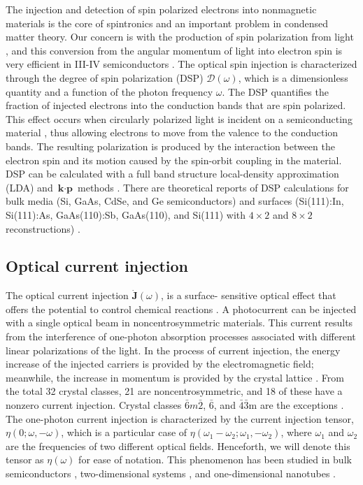 \documentclass[pss]{wiley2sp} %
\begin{document}
The injection and detection of spin polarized electrons into nonmagnetic
materials is the core of spintronics \cite{vzuticRMP04,fertRMP08} and an
important  problem in condensed matter theory. Our concern is with the
production of spin polarization from light \cite{LampelPRL68}, and this
conversion from the angular momentum of light into electron spin is very
efficient in III-IV semiconductors \cite{dyakonovOO84}. The optical spin
injection is characterized through the degree of spin polarization (DSP)
$\mathcal{D}(\omega)$, which is a dimensionless quantity and a function of the
photon frequency $\omega$. The DSP quantifies the fraction of injected
electrons into the conduction bands that are spin polarized. This effect
occurs when circularly polarized light is incident on a semiconducting
material \cite{dyakonovOO84}, thus allowing electrons to move from the valence
to the conduction bands. The resulting polarization is produced by the
interaction between the electron spin and its motion caused by the spin-orbit
coupling in the material. DSP can be calculated with a full band structure
local-density approximation (LDA) and $\textbf{k}\cdot\textbf{p}$ methods
\cite{nastosPRB07,cabellosPRB09}. There are theoretical reports of DSP
calculations for bulk media (Si, GaAs, CdSe, and Ge semiconductors)
\cite{nastosPRB07,cabellosPRB09} and surfaces (Si(111):In, Si(111):As,
GaAs(110):Sb, GaAs(110), and Si(111) with $4\times2$ and $8\times2$
reconstructions) \cite{mendozaPRB12,arzatePRB14}.


\subsection{Optical current injection}

The optical current injection $\mathbf{\dot{J}}(\omega)$, is a surface-
sensitive optical effect that offers the potential to control chemical
reactions \cite{bhatPRB05,hachePRL97}. A photocurrent can be injected with a
single optical beam in noncentrosymmetric materials. This current results from
the interference of one-photon absorption processes associated with different
linear polarizations of the light. In the process of current injection, the
energy increase of the injected carriers is provided by the electromagnetic
field; meanwhile, the increase in momentum is provided by the crystal lattice
\cite{arzatePRB14}. From the total 32 crystal classes, 21 are
noncentrosymmetric, and 18 of these have a nonzero current injection. Crystal
classes $\bar{6}m\bar{2}$, $\bar{6}$, and $\bar{4}$$\bar{3}$m are the
exceptions \cite{sipePRB00}. The one-photon current injection is characterized
by the current injection tensor, $\eta(0;\omega,−\omega)$, which is a
particular case of $\eta(\omega_{1}-\omega_{2};\omega_{1},-\omega_{2})$, where
$\omega_{1}$ and $\omega_{2}$ are the frequencies of two different optical
fields. Henceforth, we will denote this tensor as $\eta(\omega)$ for ease of
notation. This phenomenon has been studied in bulk semiconductors
\cite{hachePRL97,sipePRB00}, two-dimensional systems
\cite{melePRB00,cabellosPRB11}, and one-dimensional nanotubes
\cite{melePRB00}.
\end{document}
